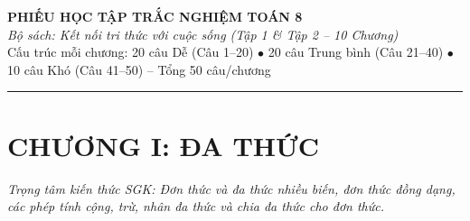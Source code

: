 \documentclass[11pt,a4paper]{article}
\begin{document}
\begin{center}
  {\LARGE\bfseries\color{primary} PHIẾU HỌC TẬP TRẮC NGHIỆM TOÁN 8}\\[4pt]
  {\normalsize\itshape\color{accent} Bộ sách: Kết nối tri thức với cuộc sống (Tập 1 \& Tập 2 – 10 Chương)}\\[4pt]
  {\small Cấu trúc mỗi chương: 20 câu Dễ (Câu 1--20) $\bullet$ 20 câu Trung bình (Câu 21--40) $\bullet$ 10 câu Khó (Câu 41--50) -- Tổng 50 câu/chương}
\end{center}
\vspace{6pt}\hrule\vspace{10pt}
\section*{\color{primary} CHƯƠNG I: ĐA THỨC}
\textit{Trọng tâm kiến thức SGK: Đơn thức và đa thức nhiều biến, đơn thức đồng dạng, các phép tính cộng, trừ, nhân đa thức và chia đa thức cho đơn thức.}\par\vspace{4pt}
\end{document}
